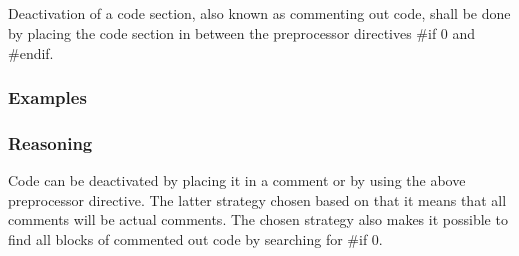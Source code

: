 \subsection*{\codingRule{}}

Deactivation of a code section, also known as commenting out code, shall be done by placing the code section in between the preprocessor directives \#if 0 and \#endif.

\subsubsection*{Examples}

\noindent
\begin{minipage}[t]{\codelstwidth\linewidth}
    
\end{minipage}
\hfill
\begin{minipage}[t]{\codelstwidth\linewidth}
    
\end{minipage}

\subsubsection*{Reasoning}

Code can be deactivated by placing it in a comment or by using the above preprocessor directive. The latter strategy chosen based on that it means that all comments will be actual comments. The chosen strategy also makes it possible to find all blocks of commented out code by searching for \#if 0.